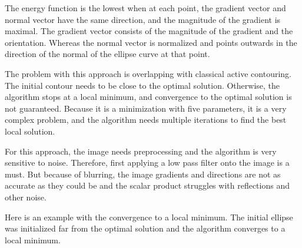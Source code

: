 The energy function is the lowest when at each point, the gradient vector and normal vector have the same direction, and the magnitude of the gradient is maximal. The gradient vector consists of the magnitude of the gradient and the orientation. Whereas the normal vector is normalized and points outwards in the direction of the normal of the ellipse curve at that point. 

The problem with this approach is overlapping with classical active contouring. The initial contour needs to be close to the optimal solution. Otherwise, the algorithm stops at a local minimum, and convergence to the optimal solution is not guaranteed. Because it is a minimization with five parameters, it is a very complex problem, and the algorithm needs multiple iterations to find the best local solution. 

For this approach, the image needs preprocessing and the algorithm is very sensitive to noise. Therefore, first applying a low pass filter onto the image is a must. But because of blurring, the image gradients and directions are not as accurate as they could be and the scalar product struggles with reflections and other noise.

Here is an example with the convergence to a local minimum. The initial ellipse was initialized far from the optimal solution and the algorithm converges to a local minimum. 


